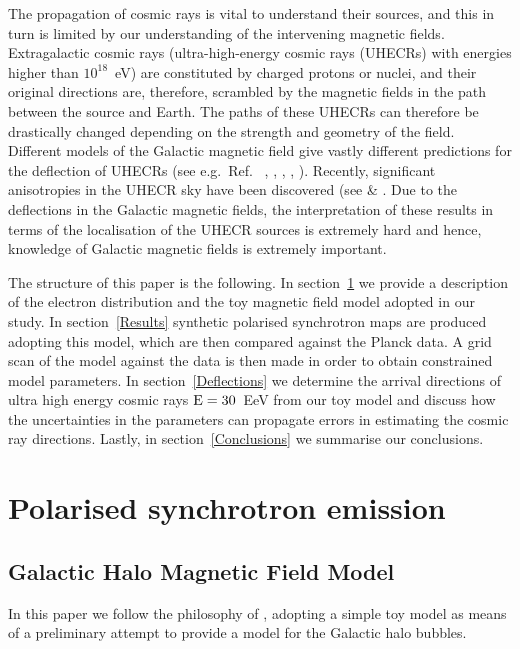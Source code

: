 \documentclass[usenatbib]{mnras}
\begin{document}
The propagation of cosmic rays is vital to understand their sources, and this in turn is limited by our understanding of the intervening magnetic fields. Extragalactic cosmic rays (ultra-high-energy cosmic rays (UHECRs) with energies higher than $10^{18}$~eV) are constituted by charged protons or nuclei, and their original directions are, therefore, scrambled by the magnetic fields in the path between the source and Earth. The paths of these UHECRs can therefore be drastically changed depending on the strength and geometry of the field. Different models of the Galactic magnetic field give vastly different predictions for the deflection of UHECRs (see e.g.~Ref.~ \cite{JF12}, \cite{FARRAR_2014}, \cite{PT11_2011}, \cite{Sun_2008}, \cite{Sun_2010}). Recently, significant anisotropies in the UHECR sky have been discovered (see \cite{TA_2014} \cite{ICRC_2021} \cite{Auger_Starburst2018} \& \cite{ICRC_2019}. Due to the deflections in the Galactic magnetic fields, the interpretation of these results in terms of the localisation of the UHECR sources is extremely hard and hence, knowledge of Galactic magnetic fields is extremely important. 
%


The structure of this paper is the following. In section~\ref{Methods} we provide a description of the electron distribution and the toy magnetic field model adopted in our study. In section~\ref{Results} synthetic polarised synchrotron maps are produced adopting this model, which are then compared against the Planck data. A grid scan of the model against the data is then made in order to obtain constrained model parameters. In section~\ref{Deflections} we determine the arrival directions of ultra high energy cosmic rays $\rm E = 30$~EeV from our toy model and discuss how the uncertainties in the parameters can propagate errors in estimating the cosmic ray directions. %
Lastly, in section~\ref{Conclusions} we summarise our conclusions.


\section{Polarised synchrotron emission}
\label{Methods}

\subsection{Galactic Halo Magnetic Field Model}
\label{GMF}
In this paper we follow the philosophy of \cite{West_Helicity}, adopting a simple toy model as means of a preliminary attempt to provide a model for the Galactic halo bubbles. 
\end{document}
